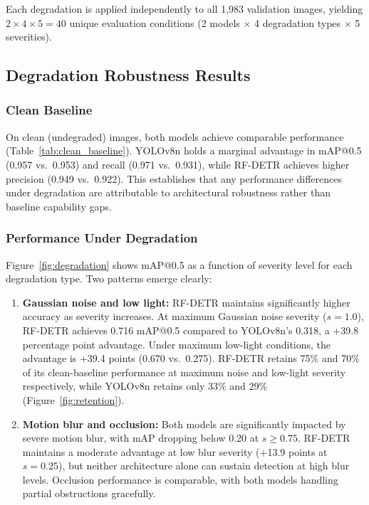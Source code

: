 \documentclass[11pt,letterpaper]{article}
\begin{document}
Each degradation is applied independently to all 1{,}983 validation images, yielding $2 \times 4 \times 5 = 40$ unique evaluation conditions (2 models $\times$ 4 degradation types $\times$ 5 severities).

\subsection{Degradation Robustness Results}
\label{sec:degradation_results}

\subsubsection{Clean Baseline}

On clean (undegraded) images, both models achieve comparable performance (Table~\ref{tab:clean_baseline}). YOLOv8n holds a marginal advantage in mAP@0.5 (0.957 vs.\ 0.953) and recall (0.971 vs.\ 0.931), while RF-DETR achieves higher precision (0.949 vs.\ 0.922). This establishes that any performance differences under degradation are attributable to architectural robustness rather than baseline capability gaps.



\subsubsection{Performance Under Degradation}

Figure~\ref{fig:degradation} shows mAP@0.5 as a function of severity level for each degradation type. Two patterns emerge clearly:

\begin{enumerate}
    \item \textbf{Gaussian noise and low light:} RF-DETR maintains significantly higher accuracy as severity increases. At maximum Gaussian noise severity ($s = 1.0$), RF-DETR achieves 0.716 mAP@0.5 compared to YOLOv8n's 0.318, a +39.8 percentage point advantage. Under maximum low-light conditions, the advantage is +39.4 points (0.670 vs.\ 0.275). RF-DETR retains 75\% and 70\% of its clean-baseline performance at maximum noise and low-light severity respectively, while YOLOv8n retains only 33\% and 29\% (Figure~\ref{fig:retention}).

    \item \textbf{Motion blur and occlusion:} Both models are significantly impacted by severe motion blur, with mAP dropping below 0.20 at $s \geq 0.75$. RF-DETR maintains a moderate advantage at low blur severity (+13.9 points at $s = 0.25$), but neither architecture alone can sustain detection at high blur levels. Occlusion performance is comparable, with both models handling partial obstructions gracefully.
\end{enumerate}
\end{document}

